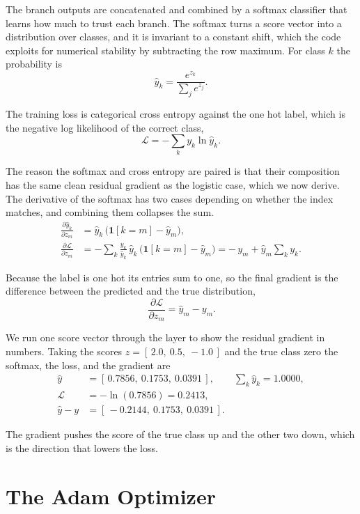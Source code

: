 \documentclass[12pt,letterpaper]{article}
\begin{document}
The branch outputs are concatenated and combined by a softmax classifier that
learns how much to trust each branch. The softmax turns a score vector into a
distribution over classes, and it is invariant to a constant shift, which the
code exploits for numerical stability by subtracting the row maximum. For class
$k$ the probability is
\[
\hat y_k = \frac{e^{z_k}}{\sum_j e^{z_j}} .
\]

The training loss is categorical cross entropy against the one hot label, which
is the negative log likelihood of the correct class,
\[
\mathcal{L} = -\sum_k y_k \ln \hat y_k .
\]

The reason the softmax and cross entropy are paired is that their composition
has the same clean residual gradient as the logistic case, which we now derive.
The derivative of the softmax has two cases depending on whether the index
matches, and combining them collapses the sum.
\begin{align*}
\frac{\partial \hat y_k}{\partial z_m}
  &= \hat y_k\,\bigl(\mathbf{1}[k=m] - \hat y_m\bigr), \\
\frac{\partial \mathcal{L}}{\partial z_m}
  &= -\sum_k \frac{y_k}{\hat y_k}\,\hat y_k\,\bigl(\mathbf{1}[k=m] - \hat y_m\bigr)
   = -\,y_m + \hat y_m \sum_k y_k .
\end{align*}

Because the label is one hot its entries sum to one, so the final gradient is
the difference between the predicted and the true distribution,
\[
\boxed{\,\frac{\partial \mathcal{L}}{\partial z_m} = \hat y_m - y_m.}
\]

We run one score vector through the layer to show the residual gradient in
numbers. Taking the scores $z = [\,2.0,\ 0.5,\ -1.0\,]$ and the true class zero
the softmax, the loss, and the gradient are
\begin{align*}
\hat y &= [\,0.7856,\ 0.1753,\ 0.0391\,], \qquad \textstyle\sum_k \hat y_k = 1.0000, \\
\mathcal{L} &= -\ln(0.7856) = 0.2413, \\
\hat y - y &= [\,-0.2144,\ 0.1753,\ 0.0391\,].
\end{align*}

The gradient pushes the score of the true class up and the other two down, which
is the direction that lowers the loss.

\clearpage
\section{The Adam Optimizer}
\end{document}
